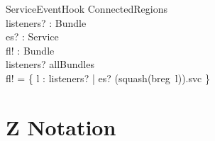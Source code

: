 \documentclass[a4paper,9pt]{article}
\begin{document}
\begin{schema}{ServiceEventHook}
  \Xi ConnectedRegions \\
  listeners? : \power Bundle \\
  es? : Service \\
  fl! : \power Bundle \\
\where
  listeners? \subseteq allBundles \\
  fl! = \{ l : listeners? | es? \in (squash(breg~l)).svc \} \\
\end{schema}


\newpage
\section{Z Notation}
\label{cha:znot}

\makeatletter %

\def\symtab{\setbox0=\vbox\bgroup \def\\{\cr}
        \halign\bgroup\strut$##$\hfil&\quad##\hfil\cr}
\def\endsymtab{\crcr\egroup\egroup
        \dimen0=\ht0 \divide\dimen0 by2 \advance\dimen0 by\ht\strutbox
        \splittopskip=\ht\strutbox \vbadness=10000
        \predisplaypenalty=0
        $$\halign{##\cr\hbox to\linewidth{%
                \valign{##\vfil\cr
                        \setbox1=\vsplit0 to\dimen0 \unvbox1\cr 
                        \noalign{\hfil}\unvbox0\cr
                        \noalign{\hfil}}}\cr 
                \noalign{\prevdepth=\dp\strutbox}}$$
        \global\@ignoretrue}

\makeatother 
\end{document}
